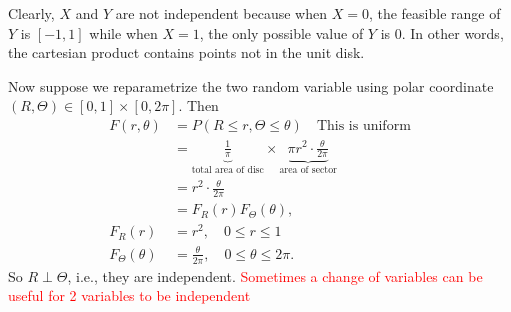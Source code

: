 \documentclass[twoside]{article}
\newcommand{\note}[1]{\textcolor{red}{#1}}
\begin{document}



Clearly, $X$ and $Y$ are not independent because when $X=0$, the feasible range of $Y$ is $[-1,1]$ while
when $X=1$, the only possible value of $Y$ is $0$. In other words, the cartesian product contains points not in the unit disk.

Now suppose we reparametrize the two random variable using polar coordinate $(R,\Theta) \in [0,1]\times [0,2\pi]$. 
Then
\begin{align*}
F(r,\theta) &= P(R\leq r, \Theta\leq\theta) {\quad \mbox{This is uniform}}\\
&  = \underbrace{\frac{1}{\pi}}_{\mbox{total area of disc}} \times \underbrace{\pi r^2\cdot \frac{\theta}{2\pi}}_{\mbox{area of sector}}\\
& = r^2 \cdot \frac{\theta}{2\pi}\\
& = F_R(r) F_\Theta(\theta),\\
F_R(r)& = r^2,\quad 0\leq r\leq 1\\
F_\Theta(\theta)& = \frac{\theta}{2\pi}, \quad 0\leq \theta\leq 2\pi.
\end{align*}
So $R\perp \Theta$, i.e., they are independent.
\note{Sometimes a change of variables can be useful for 2 variables to be independent}
\end{document}

